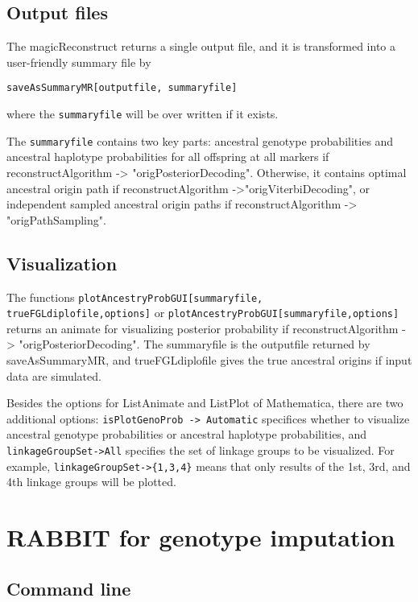 \documentclass[12pt]{article}
\begin{document}
\subsection{Output files}

The magicReconstruct returns a single output file, and it is transformed into a user-friendly summary file by 
\begin{verbatim}
saveAsSummaryMR[outputfile, summaryfile]
\end{verbatim}
where the \verb|summaryfile| will be over written if it exists. 

The \verb|summaryfile|  contains two key parts: ancestral genotype probabilities and ancestral haplotype probabilities for all offspring at all markers if reconstructAlgorithm -> "origPosteriorDecoding". Otherwise, it contains optimal ancestral origin path if  reconstructAlgorithm ->"origViterbiDecoding", or independent sampled ancestral origin paths if reconstructAlgorithm -> "origPathSampling". 

\subsection{Visualization}

The functions \verb|plotAncestryProbGUI[summaryfile, trueFGLdiplofile,options]| or \verb|plotAncestryProbGUI[summaryfile,options]| returns an animate for visualizing posterior probability if reconstructAlgorithm -> "origPosteriorDecoding". The summaryfile is the outputfile returned by saveAsSummaryMR, and trueFGLdiplofile gives the true ancestral origins if input data are simulated. 

Besides the options for ListAnimate and ListPlot of Mathematica, there are two additional options: \verb|isPlotGenoProb -> Automatic| specifices whether to visualize ancestral genotype probabilities or ancestral haplotype probabilities, and \verb|linkageGroupSet->All| specifies the set of linkage groups to be visualized. For example, \verb|linkageGroupSet->{1,3,4}| means that only results of the 1st, 3rd, and 4th linkage groups will be plotted. 

\section{RABBIT for genotype imputation}

\subsection{Command line}
\end{document}
